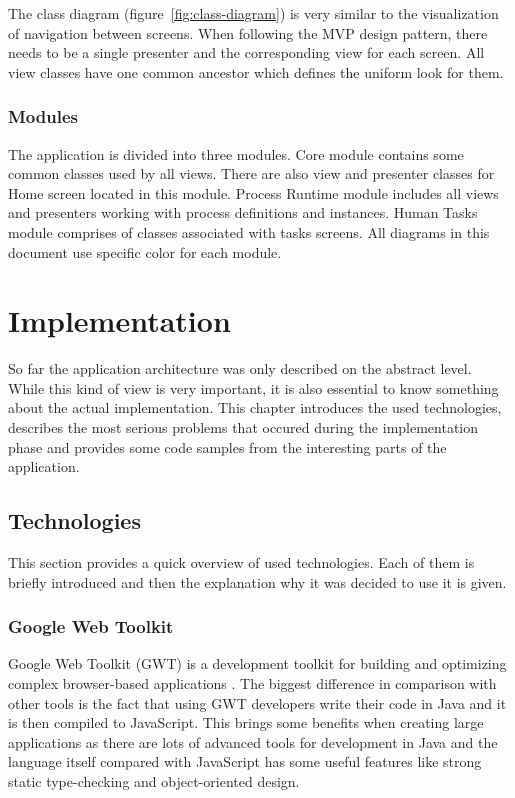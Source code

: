 \documentclass[12pt,oneside,final]{fithesis2}
\begin{document}
The class diagram (figure~\ref{fig:class-diagram}) is very similar to the visualization of navigation between screens.
When following the MVP design pattern, there needs to be a single presenter and the corresponding view for each screen.
All view classes have one common ancestor which defines the uniform look for them.

\subsection{Modules}
The application is divided into three modules.
Core module contains some common classes used by all views.
There are also view and presenter classes for Home screen located in this module.
Process Runtime module includes all views and presenters working with process definitions and instances.
Human Tasks module comprises of classes associated with tasks screens.
All diagrams in this document use specific color for each module.

\chapter{Implementation}
So far the application architecture was only described on the abstract level.
While this kind of view is very important, it is also essential to know something about the actual implementation.
This chapter introduces the used technologies, describes the most serious problems that occured during the implementation phase and provides some code samples from the interesting parts of the application.

\section{Technologies}
This section provides a quick overview of used technologies.
Each of them is briefly introduced and then the explanation why it was decided to use it is given.

\subsection{Google Web Toolkit}
Google Web Toolkit (GWT) is a development toolkit for building and optimizing complex browser-based applications \cite{gwtoverview}.
The biggest difference in comparison with other tools is the fact that using GWT developers write their code in Java and it is then compiled to JavaScript.
This brings some benefits when creating large applications as there are lots of advanced tools for development in Java and the language itself compared with JavaScript has some useful features like strong static type-checking and object-oriented design.
\end{document}
